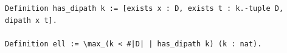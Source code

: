 \begin{lstlisting}[language=Rocq]
Definition has_dipath k := [exists x : D, exists t : k.-tuple D, dipath x t].

Definition ell := \max_(k < #|D| | has_dipath k) (k : nat).
\end{lstlisting}
